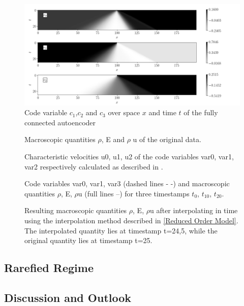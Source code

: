 \documentclass[12pt, a4paper]{article}
\begin{document}
\begin{figure}[!htbp]
	\includegraphics[width=\linewidth]{Figures/Code.png}
	\caption{Code variable $c_1$,$c_2$ and $c_3$ over space $x$ and time $t$ of the fully connected autoencoder}
	\label{Fig:Code_Fully}
\end{figure}
\begin{figure}
	
	\caption{Macroscopic quantities $\rho$, E and $\rho$ u of the original data.}
\end{figure}
\begin{figure}[!htbp]
	
	\caption{Characteristic velocities u0, u1, u2 of the code variables var0, var1, var2 respectively calculated as described in .}
\end{figure}
\begin{figure}[!htbp]
	
	\caption{Code variables var0, var1, var3 (dashed lines - -) and macroscopic quantities $\rho$, E, $\rho$u (full lines --) for three timestamps $t_0$, $t_{10}$, $t_{20}$.}
\end{figure}
\begin{figure}[!htbp]
	
	\caption{Resulting macroscopic quantities $\rho$, E, $\rho$u after interpolating in time using the interpolation method described in \ref{Reduced Order Model}. The interpolated quantity lies at timestamp t=24,5, while the original quantity lies at timestamp t=25.}
\end{figure}
\subsection{Rarefied Regime}
\subsection{Discussion and Outlook}
\newpage
{}

\newpage
\end{document}
